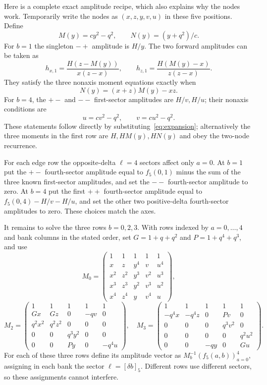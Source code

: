 \documentclass[11pt,letterpaper]{article}
\theoremstyle{definition}\newtheorem{definition}[theorem]{Definition}
\begin{document}
Here is a complete exact amplitude recipe, which also explains why the nodes work. Temporarily write the nodes as $(x,z,y,v,u)$ in these five positions. Define
\[
 M(y)=cy^2-q^2,\qquad N(y)=(y+q^2)/c.
\]
For $b=1$ the singleton $-+$ amplitude is $H/y$. The two forward amplitudes can be taken as
\[
 h_{x,1}=\frac{H(z-M(y))}{x(z-x)},\qquad
 h_{z,1}=\frac{H(M(y)-x)}{z(z-x)}.
\]
They satisfy the three nonaxis moment equations exactly when
\begin{equation}\label{eq:n5condition}
 N(y)=(x+z)M(y)-xz.
\end{equation}
For $b=4$, the $+-$ and $--$ first-sector amplitudes are $H/v,H/u$; their nonaxis conditions are
\begin{equation}\label{eq:n5negative}
 u=cv^2-q^2,\qquad v=cu^2-q^2.
\end{equation}
These statements follow directly by substituting~\eqref{eq:expansion}; alternatively the three moments in the first row are $H,HM(y),HN(y)$ and obey the two-node recurrence.

For each edge row the opposite-delta $\ell=4$ sectors affect only $a=0$. At $b=1$ put the $+-$ fourth-sector amplitude equal to $f_5(0,1)$ minus the sum of the three known first-sector amplitudes, and set the $--$ fourth-sector amplitude to zero. At $b=4$ put the first $++$ fourth-sector amplitude equal to $f_5(0,4)-H/v-H/u$, and set the other two positive-delta fourth-sector amplitudes to zero. These choices match the axes.

It remains to solve the three rows $b=0,2,3$. With rows indexed by $a=0,\ldots,4$ and bank columns in the stated order, set $G=1+q+q^2$ and $P=1+q^4+q^3$, and use
\[
 M_0=\begin{pmatrix}
1&1&1&1&1\\x&z&y^4&v&u^4\\x^2&z^2&y^3&v^2&u^3\\
x^3&z^3&y^2&v^3&u^2\\x^4&z^4&y&v^4&u
\end{pmatrix},
\]
\[
 M_2=\begin{pmatrix}
1&1&1&1&1\\Gx&Gz&0&-qv&0\\q^2x^2&q^2z^2&0&0&0\\
0&0&q^3y^2&0&0\\0&0&Py&0&-q^4u
\end{pmatrix},\quad
 M_3=\begin{pmatrix}
1&1&1&1&1\\-q^4x&-q^4z&0&Pv&0\\0&0&0&q^3v^2&0\\
0&0&0&0&q^2u^2\\0&0&-qy&0&Gu
\end{pmatrix}.
\]
For each of these three rows define its amplitude vector as $M_b^{-1}(f_5(a,b))_{a=0}^4$, assigning in each bank the sector $\ell=[\delta b]_5$. Different rows use different sectors, so these assignments cannot interfere.
\end{document}
